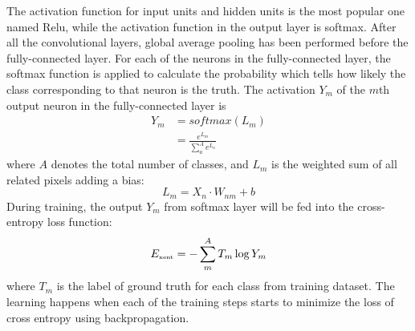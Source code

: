 The activation function for input units 
and hidden units 
is the most popular one named Relu, while the 
activation function in the output layer is 
softmax.
After all the convolutional layers, global average pooling
has been performed before the fully-connected layer.
For each of the neurons in the fully-connected layer,
the softmax function is applied to calculate 
the probability which tells how likely
the class corresponding to that neuron is the truth.
The activation \(Y_m\) of the \(m\)th output neuron in the 
fully-connected layer is
\begin{align}
    Y_m &= softmax(L_m)\\ 
        &= \displaystyle\frac{e^{L_m}}{\displaystyle\sum_{a}^{A} e^{L_a}}
\end{align}
where \(A\) denotes the total number of classes, and \(L_m\) is 
the weighted sum of all related pixels adding a bias:
\begin{equation}
    L_m = X_n\cdot W_{nm} + b
\end{equation}
During training, the output \(Y_m\) from softmax layer
will be fed into the cross-entropy loss function:
\begin{equation}
    \label{eq:entropy}
    E_{\mbox{\tiny xent}} = -\sum_{m}^{A} T_m \log Y_m
\end{equation}
where \(T_m\) is the label of ground truth for
each class from training dataset.
The learning happens when each of the training steps 
starts to minimize the loss of cross entropy
using backpropagation.

